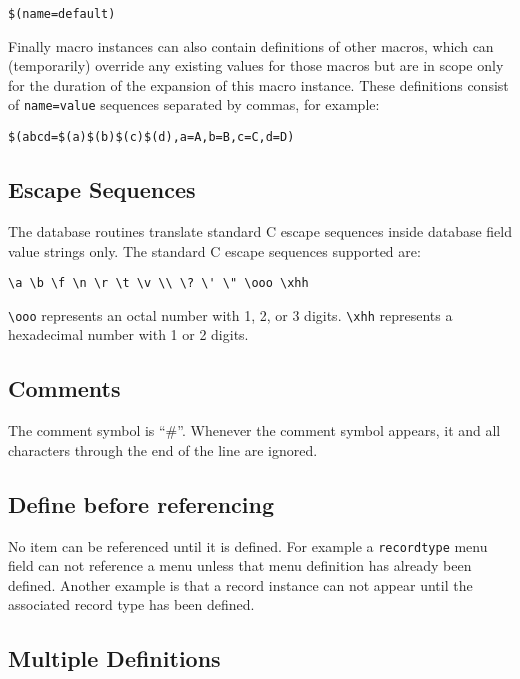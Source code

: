 \begin{verbatim}
$(name=default)
\end{verbatim}

Finally macro instances can also contain definitions of other macros, which can (temporarily) override any existing values 
for those macros but are in scope only for the duration of the expansion of this macro instance. These definitions consist 
of \verb|name=value| sequences separated by commas, for example:

\begin{verbatim}
$(abcd=$(a)$(b)$(c)$(d),a=A,b=B,c=C,d=D)
\end{verbatim}

\subsection{Escape Sequences}

The database routines translate standard C escape sequences inside database field value strings only. The standard C 
escape sequences supported are:

\begin{verbatim}
\a \b \f \n \r \t \v \\ \? \' \" \ooo \xhh
\end{verbatim}

\verb|\ooo| represents an octal number with 1, 2, or 3 digits. \verb|\xhh| represents a hexadecimal number with 1 or 2 digits.

\subsection{Comments}

The comment symbol is ``\#''. Whenever the comment symbol appears, it and all characters through the end of the line are ignored.

\subsection{Define before referencing}

No item can be referenced until it is defined. For example a \verb|recordtype| menu field can not reference a menu unless 
that menu definition has already been defined. Another example is that a record instance can not appear until the 
associated record type has been defined.

\subsection{Multiple Definitions}

